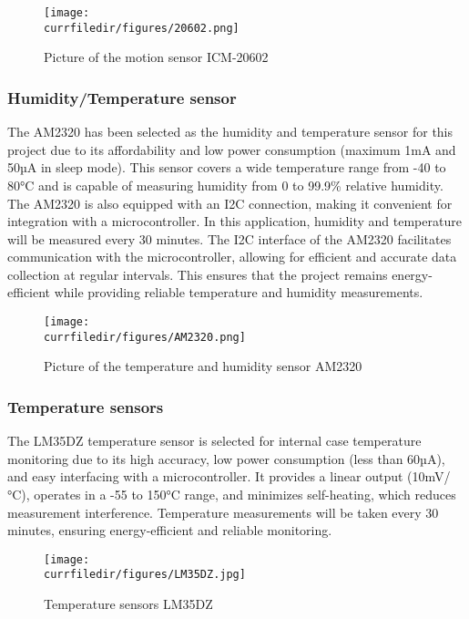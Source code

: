\begin{figure}[!h]
    \centering
    \texttt{[image: \\currfiledir/figures/20602.png]}
    \caption{Picture of the motion sensor ICM-20602}
    \cite{20602}
\end{figure}

\newpage
\subsubsection{Humidity/Temperature sensor}
The AM2320 has been selected as the humidity and temperature sensor for this project due to its affordability and low power consumption (maximum 1mA and 50µA in sleep mode). This sensor covers a wide temperature range from -40 to 80°C and is capable of measuring humidity from 0 to 99.9\% relative humidity. The AM2320 is also equipped with an I2C connection, making it convenient for integration with a microcontroller.
In this application, humidity and temperature will be measured every 30 minutes. The I2C interface of the AM2320 facilitates communication with the microcontroller, allowing for efficient and accurate data collection at regular intervals. This ensures that the project remains energy-efficient while providing reliable temperature and humidity measurements.

\begin{figure}[!h]
    \centering
    \texttt{[image: \\currfiledir/figures/AM2320.png]}
    \caption{Picture of the temperature and humidity sensor AM2320}
    \cite{AM2320}
\end{figure}


\subsubsection{Temperature sensors}
The LM35DZ temperature sensor is selected for internal case temperature monitoring due to its high accuracy, low power consumption (less than 60µA), and easy interfacing with a microcontroller. It provides a linear output (10mV/°C), operates in a -55 to 150°C range, and minimizes self-heating, which reduces measurement interference. Temperature measurements will be taken every 30 minutes, ensuring energy-efficient and reliable monitoring.
\begin{figure}[!h]
    \centering
    \texttt{[image: \\currfiledir/figures/LM35DZ.jpg]}
    \caption{Temperature sensors LM35DZ}
    \cite{Temp}
\end{figure}



